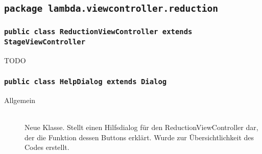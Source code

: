 \subsection{\texttt{package lambda.viewcontroller.reduction}}

\subsubsection{\normalfont \texttt{public class \textbf{ReductionViewController} extends StageViewController}}

\begin{description}
\item[TODO]
\end{description}

\subsubsection{\normalfont \texttt{public class \textbf{HelpDialog} extends Dialog}}

\begin{description}
\item[Allgemein] \hfill \\ Neue Klasse. Stellt einen Hilfsdialog für den ReductionViewController dar, der die Funktion dessen Buttons erklärt. Wurde zur Übersichtlichkeit des Codes erstellt.
\end{description}
